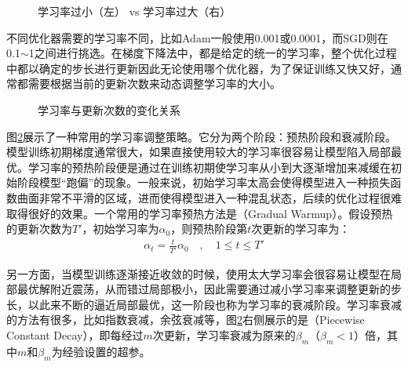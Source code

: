 \begin{figure}[htp]
\centering

\caption{学习率过小（左） vs 学习率过大（右） }
\label{fig:6-28}
\end{figure}

\parinterval 不同优化器需要的学习率不同，比如Adam一般使用0.001或0.0001，而SGD则在0.1$\sim$1之间进行挑选。在梯度下降法中，都是给定的统一的学习率，整个优化过程中都以确定的步长进行更新因此无论使用哪个优化器，为了保证训练又快又好，通常都需要根据当前的更新次数来动态调整学习率的大小。

\begin{figure}[htp]
\centering

\caption{学习率与更新次数的变化关系}
\label{fig:6-29}
\end{figure}

\parinterval 图\ref{fig:6-29}展示了一种常用的学习率调整策略。它分为两个阶段：预热阶段和衰减阶段。模型训练初期梯度通常很大，如果直接使用较大的学习率很容易让模型陷入局部最优。学习率的预热阶段便是通过在训练初期使学习率从小到大逐渐增加来减缓在初始阶段模型``跑偏''的现象。一般来说，初始学习率太高会使得模型进入一种损失函数曲面非常不平滑的区域，进而使得模型进入一种混乱状态，后续的优化过程很难取得很好的效果。一个常用的学习率预热方法是{\small{}}（Gradual Warmup）。假设预热的更新次数为$T'$，初始学习率为$\alpha_0$，则预热阶段第$t$次更新的学习率为：
\begin{eqnarray}
\alpha_t = \frac{t}{T'} \alpha_0 \quad,\quad 1 \leq t \leq T'
\label{eq:6-34}
\end{eqnarray}

\noindent 另一方面，当模型训练逐渐接近收敛的时候，使用太大学习率会很容易让模型在局部最优解附近震荡，从而错过局部极小，因此需要通过减小学习率来调整更新的步长，以此来不断的逼近局部最优，这一阶段也称为学习率的衰减阶段。学习率衰减的方法有很多，比如指数衰减，余弦衰减等，图\ref{fig:6-29}右侧展示的是{\small{}}（Piecewise Constant Decay），即每经过$m$次更新，学习率衰减为原来的$\beta_m$（$\beta_m<1$）倍，其中$m$和$\beta_m$为经验设置的超参。

\vspace{0.5em}
